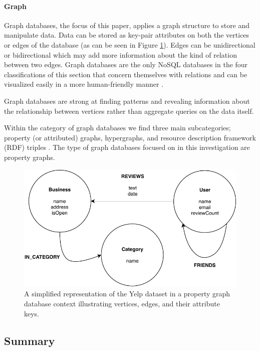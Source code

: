 \paragraph{Graph}

Graph databases, the focus of this paper, applies a graph structure to store and manipulate data. Data can be stored as key-pair attributes on both the vertices or edges of the database (as can be seen in Figure \ref{fig:graph-db}). Edges can be unidirectional or bidirectional which may add more information about the kind of relation between two edges. Graph databases are the only NoSQL databases in the four classifications of this section that concern themselves with relations and can be visualized easily in a more human-friendly manner \cite{nosql-db}.

Graph databases are strong at finding patterns and revealing information about the relationship between vertices rather than aggregate queries on the data itself.

Within the category of graph databases we find three main subcategories; property (or attributed) graphs, hypergraphs, and resource description framework (RDF) triples \cite{socialdata}. The type of graph databases focused on in this investigation are property graphs.

\begin{figure}[h]
    \centering
    \includegraphics[width=12cm]{img/graph-db.pdf}
    \caption{A simplified representation of the Yelp dataset in a property graph database context illustrating vertices, edges, and their attribute keys.}
    \label{fig:graph-db}
\end{figure}

\subsection{Summary}

